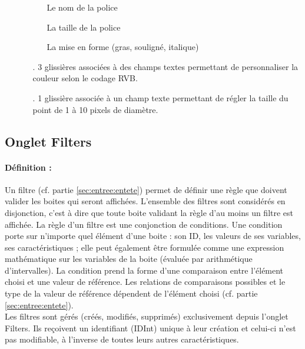 \documentclass[a4paper]{article}
\begin{document}
\begin{itemize}
\begin{itemize}
    \begin{itemize}
    \item[] Le nom de la police
    \item[] La taille de la police
    \item[] La mise en forme (gras, souligné, italique)
    \end{itemize}
  \item[.] 3 glissières associées à des champs textes permettant de personnaliser la couleur selon le codage RVB.
  \item[.] 1 glissière associée à un champ texte permettant de régler la taille du point de 1 à 10 pixels de diamètre. \danger
  \end{itemize}
\end{itemize}

\subsection{Onglet Filters}\label{sec:onglet:flt}
\paragraph{Définition :} Un filtre (cf. partie \ref{sec:entree:entete}) permet de définir une règle que doivent valider les boites qui seront affichées. L'ensemble des filtres sont considérés en disjonction, c'est à dire que toute boite validant la règle d'au moins un filtre est affichée. La règle d'un filtre est une conjonction de conditions. Une condition porte sur n'importe quel élément d'une boite : son ID, les valeurs de ses variables, ses caractéristiques ; elle peut également être formulée comme une expression mathématique sur les variables de la boite (évaluée par arithmétique d'intervalles). La condition prend la forme d'une comparaison entre l'élément choisi et une valeur de référence. Les relations de comparaisons possibles et le type de la valeur de référence dépendent de l'élément choisi (cf. partie \ref{sec:entree:entete}).\\Les filtres sont gérés (créés, modifiés, supprimés) exclusivement depuis l'onglet Filters. Ils reçoivent un identifiant (IDInt) unique à leur création et celui-ci n'est pas modifiable, à l'inverse de toutes leurs autres caractéristiques.
\end{document}

